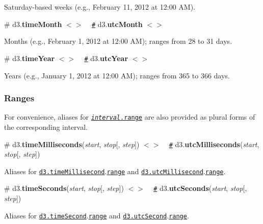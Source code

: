 Saturday-\/based weeks (e.\+g., February 11, 2012 at 12\+:00 AM).

\label{_timeMonth}%
\# d3.{\bfseries time\+Month} \href{https://github.com/d3/d3-time/blob/master/src/month.js}{\tt $<$$>$} ~\newline
\href{#timeMonth}{\tt \#} d3.{\bfseries utc\+Month} \href{https://github.com/d3/d3-time/blob/master/src/utcMonth.js}{\tt $<$$>$}

Months (e.\+g., February 1, 2012 at 12\+:00 AM); ranges from 28 to 31 days.

\label{_timeYear}%
\# d3.{\bfseries time\+Year} \href{https://github.com/d3/d3-time/blob/master/src/year.js}{\tt $<$$>$} ~\newline
\href{#timeYear}{\tt \#} d3.{\bfseries utc\+Year} \href{https://github.com/d3/d3-time/blob/master/src/utcYear.js}{\tt $<$$>$}

Years (e.\+g., January 1, 2012 at 12\+:00 AM); ranges from 365 to 366 days.

\subsubsection*{Ranges}

For convenience, aliases for \href{#interval_range}{\tt {\itshape interval}.range} are also provided as plural forms of the corresponding interval.

\label{_timeMilliseconds}%
\# d3.{\bfseries time\+Milliseconds}({\itshape start}, {\itshape stop}\mbox{[}, {\itshape step}\mbox{]}) \href{https://github.com/d3/d3-time/blob/master/src/millisecond.js#L26}{\tt $<$$>$} ~\newline
\href{#timeMilliseconds}{\tt \#} d3.{\bfseries utc\+Milliseconds}({\itshape start}, {\itshape stop}\mbox{[}, {\itshape step}\mbox{]})

Aliases for \href{#timeMillisecond}{\tt d3.\+time\+Millisecond}.\href{#interval_range}{\tt range} and \href{#timeMillisecond}{\tt d3.\+utc\+Millisecond}.\href{#interval_range}{\tt range}.

\label{_timeSeconds}%
\# d3.{\bfseries time\+Seconds}({\itshape start}, {\itshape stop}\mbox{[}, {\itshape step}\mbox{]}) \href{https://github.com/d3/d3-time/blob/master/src/second.js#L15}{\tt $<$$>$} ~\newline
\href{#timeSeconds}{\tt \#} d3.{\bfseries utc\+Seconds}({\itshape start}, {\itshape stop}\mbox{[}, {\itshape step}\mbox{]})

Aliases for \href{#timeSecond}{\tt d3.\+time\+Second}.\href{#interval_range}{\tt range} and \href{#timeSecond}{\tt d3.\+utc\+Second}.\href{#interval_range}{\tt range}.

